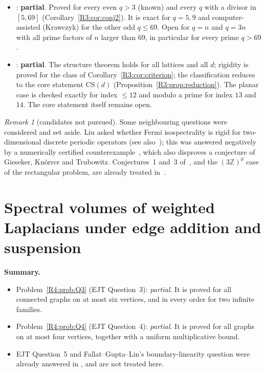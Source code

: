 \documentclass[11pt]{amsart}
\theoremstyle{definition}
\theoremstyle{remark}
\newtheorem{remark}[theorem]{Remark}
\providecommand{\R}{\mathbb R}
\providecommand{\Z}{\mathbb Z}
\begin{document}
\begin{itemize}
\item \cite[Conjecture~2]{R3-FFORS}: \textbf{partial}. Proved for every even $q>3$
(known) and every $q$ with a divisor in $[5,69]$
(Corollary~\ref{R3:cor:conj2}). It is exact for $q=5,9$ and computer-assisted
(Krawczyk) for the other odd $q\le69$. Open for $q=n$ and $q=3n$ with all prime
factors of $n$ larger than $69$, in particular for every prime $q>69$.
\item \cite[Problem~1]{R3-FFORS}: \textbf{partial}. The structure theorem holds
for all lattices and all $d$; rigidity is proved for the class of
Corollary~\ref{R3:cor:criterion}; the classification reduces to the core statement
$\mathrm{CS}(d)$ (Proposition~\ref{R3:prop:reduction}). The planar case is checked
exactly for index $\le12$ and modulo a prime for index $13$ and $14$. The core
statement itself remains open.
\end{itemize}

\begin{remark}[candidates not pursued]
Some neighbouring questions were considered and set aside. Liu asked whether
Fermi isospectrality is rigid for two-dimensional discrete periodic operators (see
also~\cite{R3-Liu23}); this was answered negatively by a numerically certified
counterexample~\cite{R3-BFL}, which also disproves a conjecture of Gieseker,
Kn\"orrer and Trubowitz. Conjectures~1 and~3 of~\cite{R3-FFORS}, and the
$(3\Z)^d$ case of the rectangular problem, are already treated in~\cite{K-034}.
\end{remark}


\providecommand{\R}{\mathbb{R}}
\providecommand{\one}{\mathbf{1}}
\providecommand{\RG}{\mathcal{R}}
\providecommand{\tr}{\operatorname{tr}}
\providecommand{\spec}{\operatorname{spec}}
\providecommand{\Exp}{\operatorname{Exp}}

\section{Spectral volumes of weighted Laplacians under edge addition and suspension}
\label{R4:sec}

\noindent\textbf{Summary.}
\begin{itemize}
\item Problem~\ref{R4:prob:Q3} (EJT Question~3): \emph{partial}.  It is
proved for all connected graphs on at most six vertices, and in every
order for two infinite families.
\item Problem~\ref{R4:prob:Q4} (EJT Question~4): \emph{partial}.  It is
proved for all graphs on at most four vertices, together with a uniform
multiplicative bound.
\item EJT Question~5 and Fallat--Gupta--Lin's boundary-linearity question
were already answered in \cite{K-015}, and are not treated here.
\end{itemize}
\end{document}
